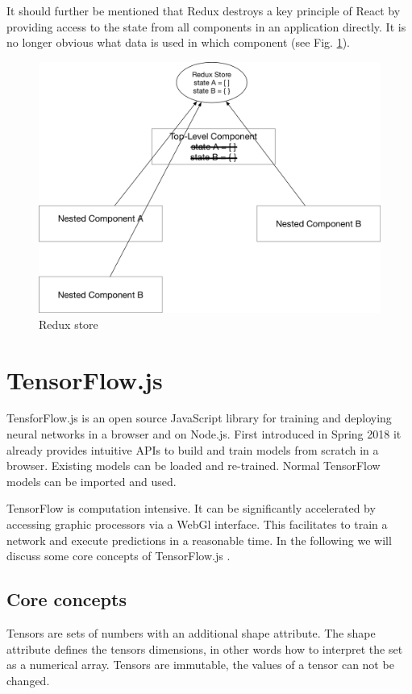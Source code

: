 It should further be mentioned that Redux destroys a key principle of React by 
providing access to the state from all components in an application directly. 
It is no longer obvious what data is used in which component (see Fig. \ref{fig:Redux}).
\begin{figure}[H]
	\centering
	\includegraphics[width=0.8\linewidth]{bilder/grundlagen/reduxStore.png}
	\caption{Redux store}
	\label{fig:Redux}
\end{figure}

\section{TensorFlow.js}
TensforFlow.js is an open source JavaScript library for training and deploying
neural networks in a browser and on Node.js. 
First introduced in Spring 2018 it already provides intuitive APIs to build and train models from scratch in a browser.
Existing models can be loaded and re-trained.
Normal TensorFlow models can be imported and used. 

TensorFlow is computation intensive.
It can be significantly accelerated by accessing graphic processors via a WebGl interface.
This facilitates to train a network and execute predictions in a reasonable time. 
In the following we will discuss some core concepts of TensorFlow.js \cite{TenosrFLowJs}. 

\subsection{Core concepts}

Tensors are sets of numbers with an additional shape attribute.
The shape attribute defines the tensors dimensions, 
in other words how to interpret the set as a numerical array.
Tensors are immutable, the values of a tensor can not be changed. 

